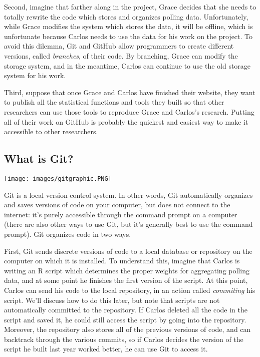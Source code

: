 \documentclass[
]{book}
\begin{document}
Second, imagine that farther along in the project, Grace decides that she needs to totally rewrite the code which stores and organizes polling data. Unfortunately, while Grace modifies the system which stores the data, it will be offline, which is unfortunate because Carlos needs to use the data for his work on the project. To avoid this dilemma, Git and GitHub allow programmers to create different versions, called \emph{branches}, of their code. By branching, Grace can modify the storage system, and in the meantime, Carlos can continue to use the old storage system for his work.

Third, suppose that once Grace and Carlos have finished their website, they want to publish all the statistical functions and tools they built so that other researchers can use those tools to reproduce Grace and Carlos's research. Putting all of their work on GitHub is probably the quickest and easiest way to make it accessible to other researchers.

\hypertarget{what-is-git}{%
\subsection{What is Git?}\label{what-is-git}}

\texttt{[image: images/gitgraphic.PNG]}

Git is a local version control system. In other words, Git automatically organizes and saves versions of code on your computer, but does not connect to the internet: it's purely accessible through the command prompt on a computer (there are also other ways to use Git, but it's generally best to use the command prompt). Git organizes code in two ways.

First, Git sends discrete versions of code to a local database or repository on the computer on which it is installed. To understand this, imagine that Carlos is writing an R script which determines the proper weights for aggregating polling data, and at some point he finishes the first version of the script. At this point, Carlos can send his code to the local repository, in an action called \emph{commiting} his script. We'll discuss how to do this later, but note that scripts are not automatically committed to the repository. If Carlos deleted all the code in the script and saved it, he could still access the script by going into the repository. Moreover, the repository also stores all of the previous versions of code, and can backtrack through the various commits, so if Carlos decides the version of the script he built last year worked better, he can use Git to access it.
\end{document}
